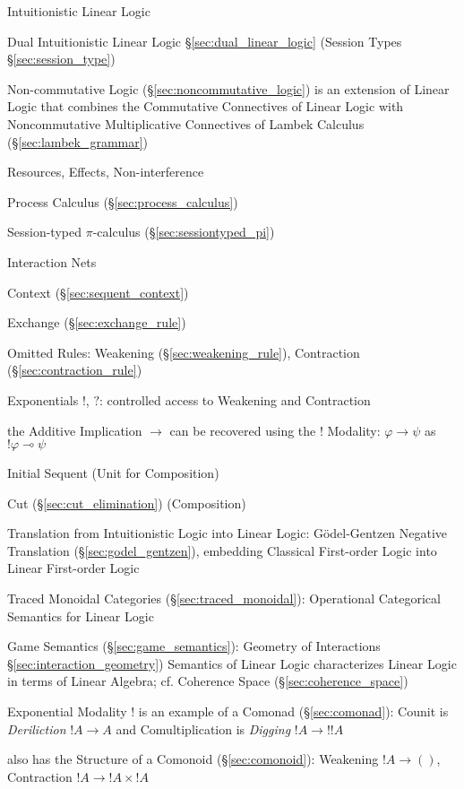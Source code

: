 Intuitionistic Linear Logic

Dual Intuitionistic Linear Logic \S\ref{sec:dual_linear_logic}
(Session Types \S\ref{sec:session_type}) \cite{caires-pfenning10}

\fist Non-commutative Logic (\S\ref{sec:noncommutative_logic}) is an
extension of Linear Logic that combines the Commutative Connectives of
Linear Logic with Noncommutative Multiplicative Connectives of Lambek
Calculus (\S\ref{sec:lambek_grammar})

Resources, Effects, Non-interference \cite{caires-pfenning10}

Process Calculus (\S\ref{sec:process_calculus})

Session-typed $\pi$-calculus (\S\ref{sec:sessiontyped_pi})

Interaction Nets %

Context (\S\ref{sec:sequent_context})

Exchange (\S\ref{sec:exchange_rule})

Omitted Rules: Weakening (\S\ref{sec:weakening_rule}), Contraction
(\S\ref{sec:contraction_rule})

Exponentials $!$, $?$: controlled access to Weakening and Contraction

the Additive Implication $\rightarrow$ can be recovered using the $!$
Modality: $\varphi \rightarrow \psi$ as $!\varphi \multimap \psi$

Initial Sequent (Unit for Composition)

Cut (\S\ref{sec:cut_elimination}) (Composition)

Translation from Intuitionistic Logic into Linear Logic:
G\"odel-Gentzen Negative Translation (\S\ref{sec:godel_gentzen}),
embedding Classical First-order Logic into Linear First-order Logic

Traced Monoidal Categories (\S\ref{sec:traced_monoidal}): Operational
Categorical Semantics for Linear Logic

Game Semantics (\S\ref{sec:game_semantics}): Geometry of Interactions
\S\ref{sec:interaction_geometry}) Semantics of Linear Logic
characterizes Linear Logic in terms of Linear Algebra; cf. Coherence
Space (\S\ref{sec:coherence_space})

Exponential Modality $!$ is an example of a Comonad
(\S\ref{sec:comonad}): Counit is \emph{Deriliction} $!A \rightarrow A$
and Comultiplication is \emph{Digging} $!A \rightarrow !!A$

also has the Structure of a Comonoid (\S\ref{sec:comonoid}): Weakening
$!A \rightarrow ()$, Contraction $!A \rightarrow !A \times !A$



